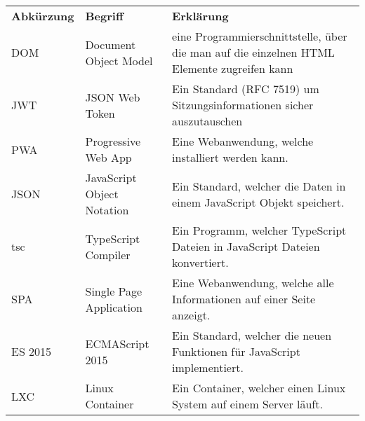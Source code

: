 
\begin{table}[H]
    \begin{tabular}{|p{}|p{}|p{}|} \hline
        \textbf{Abkürzung} & \textbf{Begriff} & \textbf{Erklärung} \\ \hhline{|=|=|=|}
        DOM & Document Object Model & eine Programmierschnittstelle, über die man auf die einzelnen HTML Elemente zugreifen kann \\ \hline
        JWT & JSON Web Token & Ein Standard (RFC 7519) um Sitzungsinformationen sicher auszutauschen \\ \hline
        PWA & Progressive Web App & Eine Webanwendung, welche installiert werden kann. \\ \hline
        JSON & JavaScript Object Notation & Ein Standard, welcher die Daten in einem JavaScript Objekt speichert. \\ \hline
        tsc & TypeScript Compiler & Ein Programm, welcher TypeScript Dateien in JavaScript Dateien konvertiert. \\ \hline
        SPA & Single Page Application & Eine Webanwendung, welche alle Informationen auf einer Seite anzeigt. \\ \hline
        ES 2015 & ECMAScript 2015 & Ein Standard, welcher die neuen Funktionen für JavaScript implementiert. \\ \hline
        LXC & Linux Container & Ein Container, welcher einen Linux System auf einem Server läuft. \\ \hline
    \end{tabular}
\end{table}